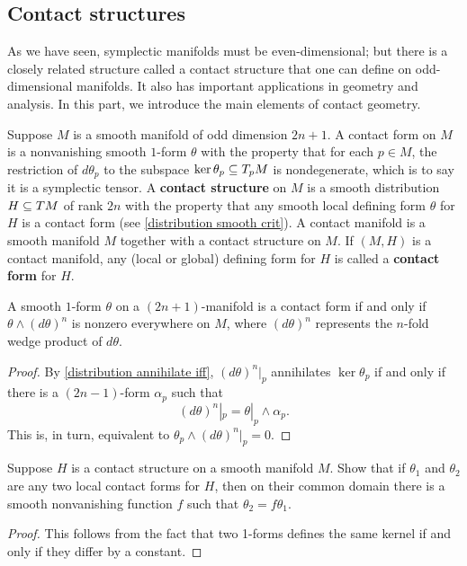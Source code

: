 \subsection{Contact structures}
As we have seen, symplectic manifolds must be even-dimensional; but there is a closely related structure called a contact structure that one can define on odd-dimensional manifolds. It also has important applications in geometry and analysis. In this part, we introduce the main elements of contact geometry.\par
Suppose $M$ is a smooth manifold of odd dimension $2n+1$. A contact form on $M$ is a nonvanishing smooth $1$-form $\theta$ with the property that for each $p\in M$, the restriction of $d\theta_p$ to the subspace $\ker\theta_p\subseteq T_pM$ is nondegenerate, which is to say it is a symplectic tensor. A \textbf{contact structure} on $M$ is a smooth distribution $H\subseteq TM$ of rank $2n$ with the property that any smooth local defining form $\theta$ for $H$ is a contact form (see \cref{distribution smooth crit}). A contact manifold is a smooth manifold $M$ together with a contact structure on $M$. If $(M,H)$ is a contact manifold, any (local or global) defining form for $H$ is called a \textbf{contact form} for $H$.

\begin{proposition}
A smooth $1$-form $\theta$ on a $(2n+1)$-manifold is a contact form if and only if $\theta\wedge (d\theta)^n$ is nonzero everywhere on $M$, where $(d\theta)^n$ represents the $n$-fold wedge product of $d\theta$.
\end{proposition}
\begin{proof}
By \cref{distribution annihilate iff}, $(d\theta)^n|_p$ annihilates $\ker\theta_p$ if and only if there is a $(2n-1)$-form $\alpha_p$ such that
\[(d\theta)^n|_p=\theta|_p\wedge\alpha_p.\]
This is, in turn, equivalent to $\theta_p\wedge(d\theta)^n|_p=0$.
\end{proof}

\begin{proposition}
Suppose $H$ is a contact structure on a smooth manifold $M$. Show that if $\theta_1$ and $\theta_2$ are any two local contact forms for $H$, then on their common domain there is a smooth nonvanishing function $f$ such that $\theta_2=f\theta_1$.
\end{proposition}
\begin{proof}
This follows from the fact that two 1-forms defines the same kernel if and only if they differ by a constant.
\end{proof}

